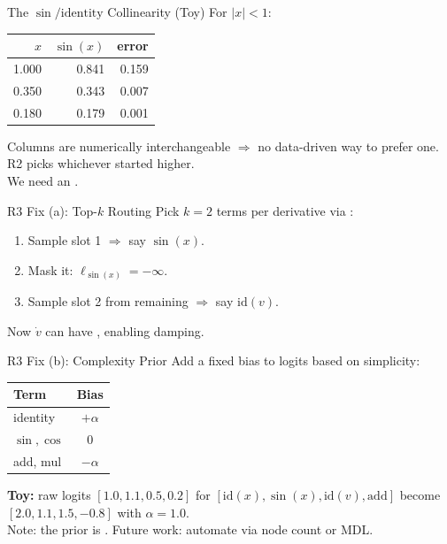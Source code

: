 \documentclass[
11pt,notheorems,hyperref={pdfauthor=Aniruddha Pandey}
]{beamer}
\begin{document}
\begin{frame}{The $\sin/\mathrm{identity}$ Collinearity (Toy)}
For $|x|<1$:
\begin{table}
    \centering
    \begin{tabular}{@{}rrr@{}}
        \toprule
        $x$    & $\sin(x)$ & error \\
        \midrule
        1.000 & 0.841 & 0.159 \\
        0.350 & 0.343 & 0.007 \\
        0.180 & 0.179 & 0.001 \\
        \bottomrule
    \end{tabular}
\end{table}
Columns are numerically interchangeable $\Rightarrow$ no data-driven way to prefer one. R2 picks whichever started higher.\\[0.2cm]
We need an .
\end{frame}

\begin{frame}{R3 Fix (a): Top-$k$ Routing}
Pick $k=2$ terms per derivative via :
\begin{enumerate}
    \item Sample slot 1 $\Rightarrow$ say $\sin(x)$.
    \item Mask it: $\ell_{\sin(x)} = -\infty$.
    \item Sample slot 2 from remaining $\Rightarrow$ say $\mathrm{id}(v)$.
\end{enumerate}
\vspace{0.3cm}
Now $\dot{v}$ can have , enabling damping.
\end{frame}

\begin{frame}{R3 Fix (b): Complexity Prior}
Add a fixed bias to logits based on simplicity:
\begin{table}
    \centering
    \begin{tabular}{@{}lc@{}}
        \toprule
        Term       & Bias        \\
        \midrule
        identity   & $+\alpha$   \\
        $\sin,\cos$ & $0$         \\
        add, mul   & $-\alpha$   \\
        \bottomrule
    \end{tabular}
\end{table}
\textbf{Toy:} raw logits $[1.0,1.1,0.5,0.2]$ for $[\mathrm{id}(x),\sin(x),\mathrm{id}(v),\mathrm{add}]$ become $[2.0,1.1,1.5,-0.8]$ with $\alpha=1.0$. \\[0.2cm]
\alert{Note:} the prior is . Future work: automate via node count or MDL.
\end{frame}
\end{document}
